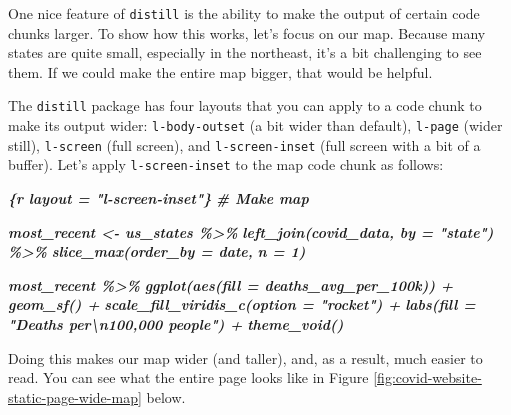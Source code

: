 \documentclass[
]{book}
\newenvironment{Shaded}{\begin{snugshade}}{\end{snugshade}}
\newcommand{\InformationTok}[1]{\textcolor[rgb]{0.56,0.35,0.01}{\textbf{\textit{#1}}}}
\begin{document}
One nice feature of \texttt{distill} is the ability to make the output of certain code chunks larger. To show how this works, let's focus on our map. Because many states are quite small, especially in the northeast, it's a bit challenging to see them. If we could make the entire map bigger, that would be helpful.

The \texttt{distill} package has four layouts that you can apply to a code chunk to make its output wider: \texttt{l-body-outset} (a bit wider than default), \texttt{l-page} (wider still), \texttt{l-screen} (full screen), and \texttt{l-screen-inset} (full screen with a bit of a buffer). Let's apply \texttt{l-screen-inset} to the map code chunk as follows:

\begin{Shaded}
\begin{Highlighting}[]
\InformationTok{\textasciigrave{}\textasciigrave{}\textasciigrave{}\{r layout = "l{-}screen{-}inset"\}}
\InformationTok{\# Make map}

\InformationTok{most\_recent \textless{}{-} us\_states \%\textgreater{}\% }
\InformationTok{  left\_join(covid\_data, by = "state") \%\textgreater{}\% }
\InformationTok{  slice\_max(order\_by = date,}
\InformationTok{            n = 1) }

\InformationTok{most\_recent \%\textgreater{}\% }
\InformationTok{  ggplot(aes(fill = deaths\_avg\_per\_100k)) +}
\InformationTok{  geom\_sf() +}
\InformationTok{  scale\_fill\_viridis\_c(option = "rocket") +}
\InformationTok{  labs(fill = "Deaths per\textbackslash{}n100,000 people") +}
\InformationTok{  theme\_void()}
\InformationTok{\textasciigrave{}\textasciigrave{}\textasciigrave{}}
\end{Highlighting}
\end{Shaded}

Doing this makes our map wider (and taller), and, as a result, much easier to read. You can see what the entire page looks like in Figure \ref{fig:covid-website-static-page-wide-map} below.
\end{document}
